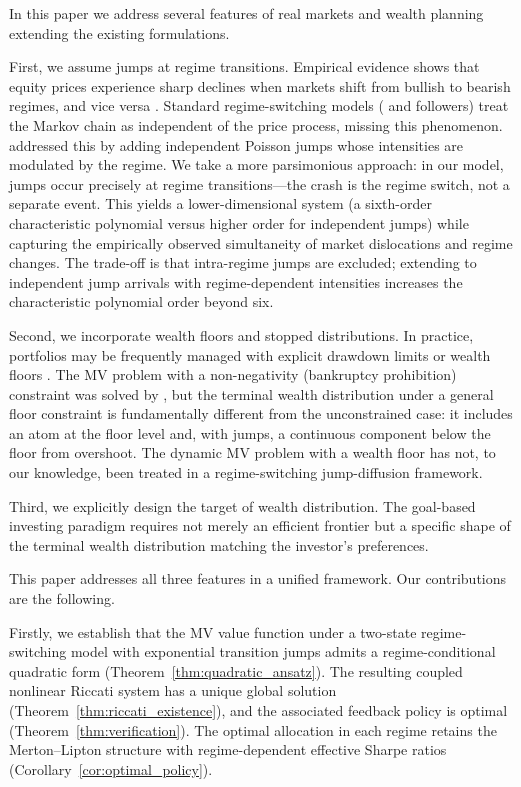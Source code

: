 \documentclass[11pt,a4paper]{article}
\numberwithin{equation}{section}
\begin{document}
In this paper we address several features of real markets and wealth planning extending the existing formulations.


First, we assume jumps at regime transitions. Empirical evidence shows that equity prices experience sharp declines when markets shift from bullish to bearish regimes, and vice versa \citep{Hamilton1989}. Standard regime-switching models (\citealt{ZhouYin2003} and followers) treat the Markov chain as independent of the price process, missing this phenomenon.  \citet{ShiXu2025} addressed this by adding independent Poisson jumps whose intensities are modulated by the regime. We take a more parsimonious approach: in our model, jumps occur precisely at regime transitions---the crash is the regime switch, not a separate event. This yields a lower-dimensional system (a sixth-order characteristic polynomial versus higher order for independent jumps) while capturing the empirically observed simultaneity of market dislocations and regime changes. The trade-off is that intra-regime jumps are excluded; extending to 
independent jump arrivals with regime-dependent intensities increases 
the characteristic polynomial order beyond six.


Second, we incorporate wealth floors and stopped distributions. In practice, portfolios may be frequently managed with explicit drawdown limits or wealth floors \citep{GrossmanZhou1993}. The MV problem with a non-negativity (bankruptcy prohibition) constraint was solved by \citet{BieleckiJinPliskaZhou2005}, but the terminal wealth distribution under a general floor constraint is fundamentally different from the unconstrained case: it includes an atom at the floor level and, with jumps, a continuous component below the floor from overshoot. The dynamic MV problem with a wealth floor has not, to our knowledge, been treated in a regime-switching jump-diffusion framework.

Third, we explicitly design the target of wealth distribution. The goal-based investing paradigm requires not merely an efficient frontier but a specific shape of the terminal wealth distribution matching the investor's preferences.


This paper addresses all three features in a unified framework. Our contributions are the following.

Firstly, we establish that the MV value function under a two-state regime-switching model with exponential transition jumps admits a regime-conditional quadratic form (Theorem~\ref{thm:quadratic_ansatz}). The resulting coupled nonlinear Riccati system has a unique global solution (Theorem~\ref{thm:riccati_existence}), and the associated feedback policy is optimal (Theorem~\ref{thm:verification}). The optimal allocation in each regime retains the Merton--Lipton structure with regime-dependent effective Sharpe ratios (Corollary~\ref{cor:optimal_policy}).
\end{document}
